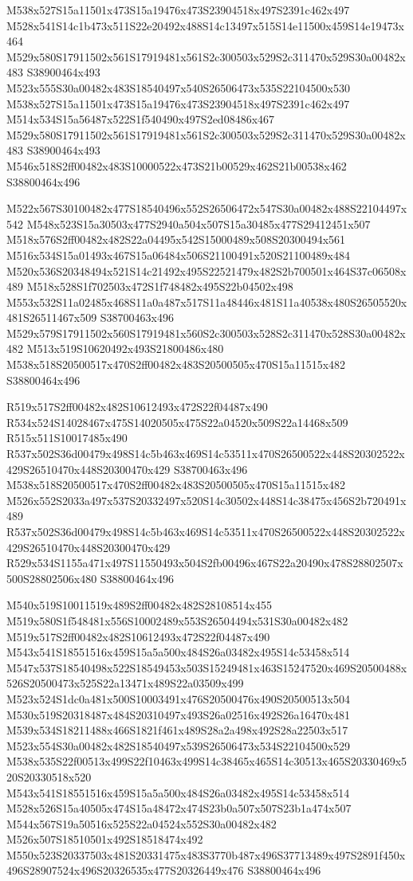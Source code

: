 \documentclass{article}
\begin{document}
\begin{multicols}{2}
M538x527S15a11501x473S15a19476x473S23904518x497S2391c462x497 M528x541S14c1b473x511S22e20492x488S14c13497x515S14e11500x459S14e19473x464 M529x580S17911502x561S17919481x561S2c300503x529S2c311470x529S30a00482x483 S38900464x493 M523x555S30a00482x483S18540497x540S26506473x535S22104500x530 M538x527S15a11501x473S15a19476x473S23904518x497S2391c462x497 M514x534S15a56487x522S1f540490x497S2ed08486x467 M529x580S17911502x561S17919481x561S2c300503x529S2c311470x529S30a00482x483 S38900464x493 M546x518S2ff00482x483S10000522x473S21b00529x462S21b00538x462 S38800464x496

M522x567S30100482x477S18540496x552S26506472x547S30a00482x488S22104497x542 M548x523S15a30503x477S2940a504x507S15a30485x477S29412451x507 M518x576S2ff00482x482S22a04495x542S15000489x508S20300494x561 M516x534S15a01493x467S15a06484x506S21100491x520S21100489x484 M520x536S20348494x521S14c21492x495S22521479x482S2b700501x464S37c06508x489 M518x528S1f702503x472S1f748482x495S22b04502x498 M553x532S11a02485x468S11a0a487x517S11a48446x481S11a40538x480S26505520x481S26511467x509 S38700463x496 M529x579S17911502x560S17919481x560S2c300503x528S2c311470x528S30a00482x482 M513x519S10620492x493S21800486x480 M538x518S20500517x470S2ff00482x483S20500505x470S15a11515x482 S38800464x496

R519x517S2ff00482x482S10612493x472S22f04487x490 R534x524S14028467x475S14020505x475S22a04520x509S22a14468x509 R515x511S10017485x490 R537x502S36d00479x498S14c5b463x469S14c53511x470S26500522x448S20302522x429S26510470x448S20300470x429 S38700463x496 M538x518S20500517x470S2ff00482x483S20500505x470S15a11515x482 M526x552S2033a497x537S20332497x520S14c30502x448S14c38475x456S2b720491x489 R537x502S36d00479x498S14c5b463x469S14c53511x470S26500522x448S20302522x429S26510470x448S20300470x429 R529x534S1155a471x497S11550493x504S2fb00496x467S22a20490x478S28802507x500S28802506x480 S38800464x496

M540x519S10011519x489S2ff00482x482S28108514x455 M519x580S1f548481x556S10002489x553S26504494x531S30a00482x482 M519x517S2ff00482x482S10612493x472S22f04487x490 M543x541S18551516x459S15a5a500x484S26a03482x495S14c53458x514 M547x537S18540498x522S18549453x503S15249481x463S15247520x469S20500488x526S20500473x525S22a13471x489S22a03509x499 M523x524S1dc0a481x500S10003491x476S20500476x490S20500513x504 M530x519S20318487x484S20310497x493S26a02516x492S26a16470x481 M539x534S18211488x466S1821f461x489S28a2a498x492S28a22503x517 M523x554S30a00482x482S18540497x539S26506473x534S22104500x529 M538x535S22f00513x499S22f10463x499S14c38465x465S14c30513x465S20330469x520S20330518x520 M543x541S18551516x459S15a5a500x484S26a03482x495S14c53458x514 M528x526S15a40505x474S15a48472x474S23b0a507x507S23b1a474x507 M544x567S19a50516x525S22a04524x552S30a00482x482 M526x507S18510501x492S18518474x492 M550x523S20337503x481S20331475x483S3770b487x496S37713489x497S2891f450x496S28907524x496S20326535x477S20326449x476 S38800464x496


\end{multicols}
\end{document}
